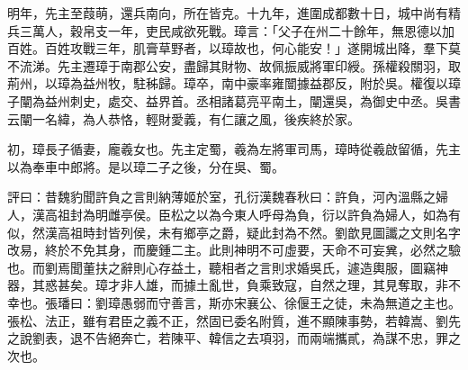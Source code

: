 \begin{pinyinscope}
明年，先主至葭萌，還兵南向，所在皆克。十九年，進圍成都數十日，城中尚有精兵三萬人，穀帛支一年，吏民咸欲死戰。璋言：「父子在州二十餘年，無恩德以加百姓。百姓攻戰三年，肌膏草野者，以璋故也，何心能安！」遂開城出降，羣下莫不流涕。先主遷璋于南郡公安，盡歸其財物、故佩振威將軍印綬。孫權殺關羽，取荊州，以璋為益州牧，駐秭歸。璋卒，南中豪率雍闓據益郡反，附於吳。權復以璋子闡為益州刺史，處交、益界首。丞相諸葛亮平南土，闡還吳，為御史中丞。吳書云闡一名緯，為人恭恪，輕財愛義，有仁讓之風，後疾終於家。

初，璋長子循妻，龐羲女也。先主定蜀，羲為左將軍司馬，璋時從羲啟留循，先主以為奉車中郎將。是以璋二子之後，分在吳、蜀。

評曰：昔魏豹聞許負之言則納薄姬於室，孔衍漢魏春秋曰：許負，河內溫縣之婦人，漢高祖封為明雌亭侯。臣松之以為今東人呼母為負，衍以許負為婦人，如為有似，然漢高祖時封皆列侯，未有鄉亭之爵，疑此封為不然。劉歆見圖讖之文則名字改易，終於不免其身，而慶鍾二主。此則神明不可虛要，天命不可妄兾，必然之驗也。而劉焉聞董扶之辭則心存益土，聽相者之言則求婚吳氏，遽造輿服，圖竊神器，其惑甚矣。璋才非人雄，而據土亂世，負乘致寇，自然之理，其見奪取，非不幸也。張璠曰：劉璋愚弱而守善言，斯亦宋襄公、徐偃王之徒，未為無道之主也。張松、法正，雖有君臣之義不正，然固已委名附質，進不顯陳事勢，若韓嵩、劉先之說劉表，退不告絕奔亡，若陳平、韓信之去項羽，而兩端攜貳，為謀不忠，罪之次也。


\end{pinyinscope}